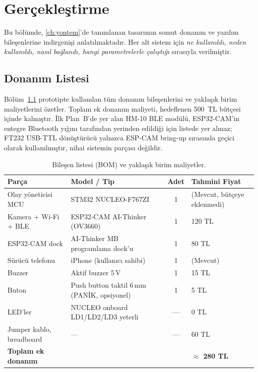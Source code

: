 \chapter{Gerçekleştirme}
\label{ch:gerceklestirme}

Bu bölümde, \ref{ch:yontem}'de tanımlanan tasarımın somut donanım ve
yazılım bileşenlerine indirgenişi anlatılmaktadır. Her alt sistem için
\emph{ne kullanıldı, neden kullanıldı, nasıl bağlandı, hangi
parametrelerle çalıştığı} sırasıyla verilmiştir.

\section{Donanım Listesi}

Bölüm~\ref{tab:bom} prototipte kullanılan tüm donanım bileşenlerini ve
yaklaşık birim maliyetlerini özetler. Toplam ek donanım maliyeti,
hedeflenen 500~TL bütçesi içinde kalmıştır. İlk Plan~B'de yer alan
HM-10 BLE modülü, ESP32-CAM'in entegre Bluetooth yığını tarafından
yerinden edildiği için listede yer almaz; FT232 USB-TTL dönüştürücü
yalnızca ESP-CAM bring-up sırasında geçici olarak kullanılmıştır,
nihai sistemin parçası değildir.

\begin{table}[h!]
\centering
\caption{Bileşen listesi (BOM) ve yaklaşık birim maliyetler.}
\label{tab:bom}
\small
\begin{tabular}{l l c l}
\toprule
\textbf{Parça} & \textbf{Model / Tip} & \textbf{Adet} & \textbf{Tahmini Fiyat}\\
\midrule
Olay yöneticisi MCU       & STM32 NUCLEO-F767ZI               & 1 & (Mevcut, bütçeye eklenmedi)\\
Kamera + Wi-Fi + BLE      & ESP32-CAM AI-Thinker (OV3660)     & 1 & 120 TL\\
ESP32-CAM dock            & AI-Thinker MB programlama dock'u  & 1 & 80 TL\\
Sürücü telefonu           & iPhone (kullanıcı sahibi)          & 1 & (Mevcut)\\
Buzzer                    & Aktif buzzer 5\,V                  & 1 & 15 TL\\
Buton                     & Push button taktil 6\,mm (PANİK, opsiyonel) & 1 & 5 TL\\
LED'ler                   & NUCLEO onboard LD1/LD2/LD3 yeterli & --- & 0 TL\\
Jumper kablo, breadboard  & ---                                & --- & 60 TL\\
\midrule
\textbf{Toplam ek donanım} & & & \textbf{$\approx$ 280 TL}\\
\bottomrule
\end{tabular}
\end{table}

